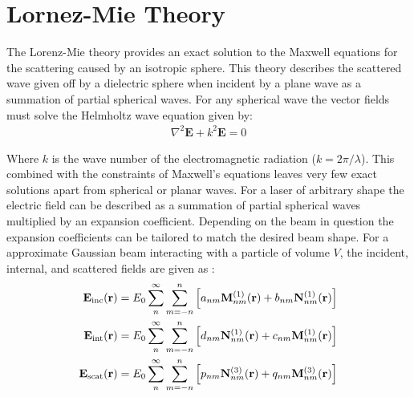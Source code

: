 \section{Lornez-Mie Theory}

The Lorenz-Mie theory provides an exact solution to the Maxwell 
equations for the scattering caused by an isotropic sphere. This 
theory describes the scattered wave given off by a dielectric 
sphere when incident by a plane wave as a summation of partial 
spherical waves. For any spherical wave the vector fields must 
solve the Helmholtz wave equation given by:
\begin{align}
	\nabla^2\mathbf{E} +k^2\mathbf{E} = 0
\end{align} 

Where $k$ is the wave number of the electromagnetic radiation 
($k = 2\pi/\lambda$). This combined with the constraints of 
Maxwell's equations leaves very few exact solutions apart from 
spherical or planar waves. For a laser of arbitrary shape the 
electric field can be described as a summation of partial 
spherical waves multiplied by an expansion coefficient. Depending 
on the beam in question the expansion coefficients can be tailored
to match the desired beam shape. For a approximate Gaussian beam 
interacting with a particle of volume $V$, the incident, internal, 
and scattered fields are given as \cite{RanhaNeves2019}: 
\begin{align}
	\label{eq:incident}
	{\bf E}_{\rm inc}({\bf r})
	&=
	E_0 \sum_{n}^\infty\sum_{m=-n}^n \left[
	a_{nm}{\bf M}_{nm}^{(1)}({\bf r})
	+ b_{nm}{\bf N}_{nm}^{(1)}({\bf r})\right]
	\\
	\label{eq:internal}
	{\bf E}_{\rm int}({\bf r})
	&=
	E_0 \sum_{n}^\infty \sum_{m=-n}^{n}\left[
	d_{nm}{\bf N}_{nm}^{(1)}({\bf r}) + c_{nm}{\bf M}_{nm}^{(1)}({\bf r})
	\right]
	\\
	\label{eq:scattered}
	{\bf E}_{\rm scat}({\bf r})
	&=
	E_0 \sum_{n}^\infty \sum_{m=-n}^n\left[
	p_{nm}{\bf N}_{nm}^{(3)}({\bf r})+q_{nm}{\bf M}_{nm}^{(3)}({\bf r})
	\right] 
\end{align}

